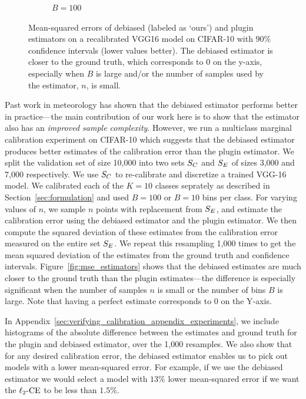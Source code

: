 \begin{figure}
\begin{subfigure}[b]{0.48\textwidth}
         \caption{$B = 100$
         }
         \label{fig:ce_vs_bins_verifying}
     \end{subfigure}
  \caption{
    Mean-squared errors of debiased (labeled as `ours') and plugin estimators on a recalibrated VGG16 model on CIFAR-10 with $90\%$ confidence intervals (lower values better). The debiased estimator is closer to the ground truth, which corresponds to $0$ on the y-axis, especially when $B$ is large and/or the number of samples used by the estimator, $n$, is small.
}
  \label{fig:mse_estimators_bins}
\end{figure}

Past work in meteorology has shown that the debiased estimator performs better in practice---the main contribution of our work here is to show that the estimator also has an \emph{improved sample complexity}. However, we run a multiclass marginal calibration experiment on CIFAR-10 which suggests that the debiased estimator produces better estimates of the calibration error than the plugin estimator. We split the validation set of size 10,000 into two sets $S_C{}$ and $S_E{}$ of sizes 3,000 and 7,000 respectively. We use $S_C{}$ to re-calibrate and discretize a trained VGG-16 model. We calibrated each of the $K = 10$ classes seprately as described in Section~\ref{sec:formulation} and used $B = 100$ or $B = 10$ bins per class. For varying values of $n$, we sample $n$ points with replacement from $S_E{}$, and estimate the calibration error using the debiased estimator and the plugin estimator. We then compute the squared deviation of these estimates from the calibration error measured on the entire set $S_E{}$. We repeat this resampling 1,000 times to get the mean squared deviation of the estimates from the ground truth and confidence intervals. Figure~\ref{fig:mse_estimators} shows that the debiased estimates are much closer to the ground truth than the plugin estimates---the difference is especially significant when the number of samples $n$ is small or the number of bins $B$ is large. Note that having a perfect estimate corresponds to $0$ on the Y-axis.

In Appendix~\ref{sec:verifying_calibration_appendix_experiments}, we include histograms of the absolute difference between the estimates and ground truth for the plugin and debiased estimator, over the 1,000 resamples. We also show that for any desired calibration error, the debiased estimator enables us to pick out models with a lower mean-squared error. For example, if we use the debiased estimator we would select a model with $13\%$ lower mean-squared error if we want the $\ell_2\mbox{-CE}$ to be less than $1.5\%$.

